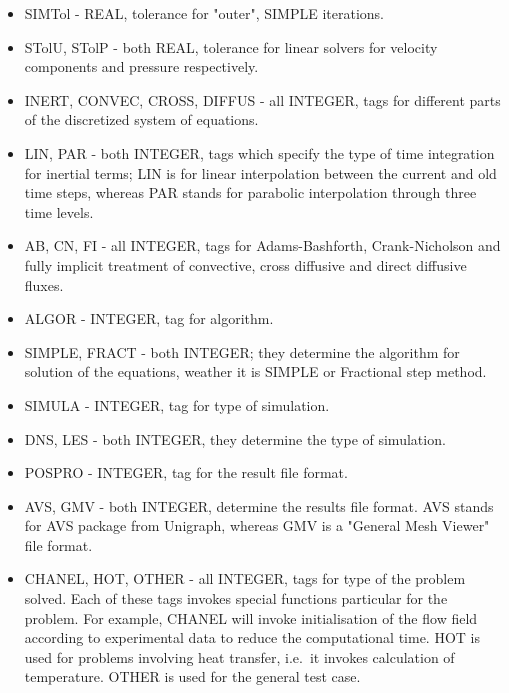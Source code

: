 \documentclass[10pt]{article}
\newcommand*{\tc}{\ttfamily} %
\begin{document}
\begin{itemize}
    \item
    {\tc SIMTol} - REAL, tolerance for "outer", SIMPLE iterations.

    \item
    {\tc STolU, STolP} - both REAL, tolerance for linear solvers for
      velocity components and pressure respectively.

    \item
    {\tc INERT, CONVEC, CROSS, DIFFUS} - all INTEGER, tags for
      different parts of the discretized system of equations.

    \item
    {\tc LIN, PAR} - both INTEGER, tags which specify the type of time
      integration for inertial terms; {\tc LIN} is for linear interpolation
      between the current and old time steps, whereas PAR stands for
      parabolic interpolation through three time levels.

    \item
    {\tc AB, CN, FI} - all INTEGER, tags for Adams-Bashforth, Crank-Nicholson
      and fully implicit treatment of convective, cross diffusive and
      direct diffusive fluxes.

    \item
    {\tc ALGOR} - INTEGER, tag for algorithm.

    \item
    {\tc SIMPLE, FRACT} - both INTEGER; they determine the algorithm for
      solution of the equations, weather it is SIMPLE or Fractional
      step method.

    \item
    {\tc SIMULA} - INTEGER, tag for type of simulation.

    \item
    {\tc DNS, LES} - both INTEGER, they determine the type of simulation.

    \item
    {\tc POSPRO} - INTEGER, tag for the result file format.

    \item
    {\tc AVS, GMV} - both INTEGER, determine the results file format. AVS
      stands for AVS package from Unigraph, whereas GMV is a "General
      Mesh Viewer" file format.

    \item
    {\tc CHANEL, HOT, OTHER} - all INTEGER, tags for type of the
      problem solved. Each of these tags invokes special functions
      particular for the problem. For example, {\tc CHANEL} will invoke
      initialisation of the flow field according to experimental
      data to reduce the computational time. {\tc HOT} is used for
      problems involving heat transfer, i.e.\ it invokes calculation of
      temperature.
      OTHER is used for the general test 
      case.


\end{itemize}
\end{document}
